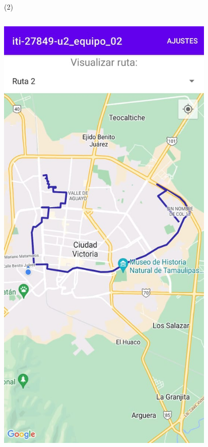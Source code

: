 \begin{frame}{ (2)}
\begin{columns}
\begin{column}{0.25\textwidth}
\includegraphics[width=0.82\textwidth]{2022_MapaVickyRanch/figs/F4}
\end{column}
\begin{column}{0.25\textwidth}  

\end{column}
\end{columns}
\end{frame}
